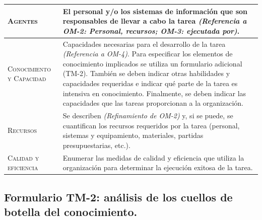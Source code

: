 \documentclass[12pt,a4paper,twoside,spanish]{article}      %
\begin{document}
\begin{table}[H]
\begin{tabularx}{\textwidth}{|l|X|}
                \textsc{Agentes} &
                El personal y/o los sistemas de información que son
                responsables de llevar a cabo la tarea \emph{(Referencia a OM-2:
                Personal, recursos; OM-3: ejecutada por)}.\\ \hline
                \textsc{Conocimiento y Capacidad} &
                Capacidades necesarias para el desarrollo de la tarea \emph{(Referencia a OM-4)}. Para especificar los elementos de conocimiento implicados se utiliza un formulario adicional (TM-2). También se deben indicar otras habilidades y capacidades requeridas e indicar qué parte de la tarea es intensiva en conocimiento. Finalmente, se deben indicar las capacidades que las tareas proporcionan a la organización. \\ \hline
                
                \textsc{Recursos} &
                Se describen \emph{(Refinamiento de OM-2)} y, si se puede, se cuantifican los recursos requeridos por la tarea (personal, sistemas y equipamiento, materiales, partidas presupuestarias, etc.). \\ \hline
                
                \textsc{Calidad y eficiencia} & Enumerar las medidas de calidad y eficiencia que utiliza la organización para determinar la ejecución exitosa de la tarea. \\ \hline
            \end{tabularx}
            
              \label{tab.TM1}
        \end{table}
        
        
        
        \pagebreak
        
    \subsection{Formulario TM-2: análisis de los cuellos de botella del conocimiento.}
    
\end{document}
